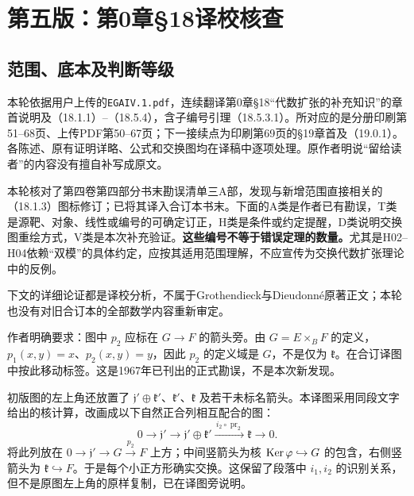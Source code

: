 \chapter*{第五版：第0章§18译校核查}

\section*{范围、底本及判断等级}
本轮依据用户上传的\texttt{EGAIV.1.pdf}，连续翻译第0章§18“代数扩张的补充知识”的章首说明及（18.1.1）--（18.5.4），含子编号引理（18.5.3.1）。所对应的是分册印刷第51--68页、上传PDF第50--67页；下一接续点为印刷第69页的§19章首及（19.0.1）。各陈述、原有证明详略、公式和交换图均在译稿中逐项处理。原作者明说“留给读者”的内容没有擅自补写成原文。

本轮核对了第四卷第四部分书末勘误清单三A部，发现与新增范围直接相关的（18.1.3）图标修订；已将其译入合订本书末。下面的A类是作者已有勘误，T类是源靶、对象、线性或编号的可确定订正，H类是条件或约定提醒，D类说明交换图重绘方式，V类是本次补充验证。\textbf{这些编号不等于错误定理的数量。}尤其是H02--H04依赖“双模”的具体约定，应按其适用范围理解，不应宣传为交换代数扩张理论中的反例。

下文的详细论证都是译校分析，不属于Grothendieck与Dieudonné原著正文；本轮也没有对旧合订本的全部数学内容重新审定。

作者明确要求：图中 $p_2$ 应标在 $G\to F$ 的箭头旁。由 $G=E\times_BF$ 的定义，$p_1(x,y)=x$、$p_2(x,y)=y$，因此 $p_2$ 的定义域是 $G$，不是仅为 $\mathfrak k$。在合订译图中按此移动标签。这是1967年已刊出的正式勘误，不是本次新发现。

初版图的左上角还放置了 $\mathfrak j'\oplus\mathfrak k'$、$\mathfrak k'$、$\mathfrak k$ 及若干未标名箭头。本译图采用同段文字给出的核计算，改画成以下自然正合列相互配合的图：
\[
 0\longrightarrow\mathfrak j'
 \longrightarrow\mathfrak j'\oplus\mathfrak k'
 \xrightarrow{\,i_2\circ\operatorname{pr}_2\,}\mathfrak k
 \longrightarrow0.
\]
将此列放在 $0\to\mathfrak j'\to G\xrightarrow{p_2}F$ 上方；中间竖箭头为核 $\operatorname{Ker}\varphi\hookrightarrow G$ 的包含，右侧竖箭头为 $\mathfrak k\hookrightarrow F$。于是每个小正方形确实交换。这保留了段落中 $i_1,i_2$ 的识别关系，但不是原图左上角的原样复制，已在译图旁说明。

